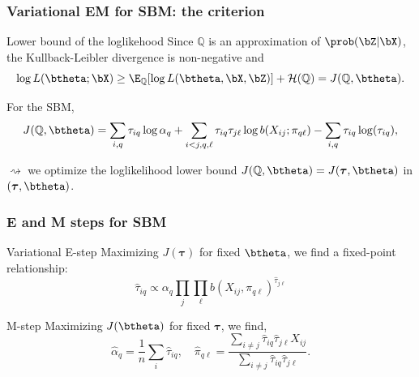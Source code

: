 \documentclass{beamer}\usepackage[]{graphicx}\usepackage[]{color}
\begin{document}
\begin{frame}
  \frametitle{Variational EM for SBM: the criterion}

  \begin{block}{Lower bound of the loglikehood}
  Since $\mathbb{Q}$ is an approximation of $\prob(\bZ|\bX)$, the Kullback-Leibler divergence is non-negative and
    \begin{equation*}
      \log L(\btheta; \bX) \geq \E_{\mathbb{Q}} [\log L(\btheta, \bX,\bZ)] + \mathcal{H}(\mathbb{Q}) = J(\mathbb{Q},\btheta).
    \end{equation*}
  \end{block}

  For the SBM,
  \begin{equation*}
  J(\mathbb{Q},\btheta) = \sum_{i,q} \tau_{iq} \log \alpha_q + \sum_{i<j,q,\ell}  \tau_{iq}  \tau_{j\ell} \log b(X_{ij} ; \pi_{q\ell}) - \sum_{i,q} \tau_{iq} \log(\tau_{iq}),
  \end{equation*}

  $\rightsquigarrow$ we optimize the loglikelihood lower bound $J(\mathbb{Q},\btheta) = J(\boldsymbol\tau,\btheta)$ in $(\boldsymbol\tau, \btheta)$.

\end{frame}

\begin{frame}
  \frametitle{E and M steps for SBM}

  \begin{block}{Variational E-step}
    Maximizing $J(\boldsymbol\tau)$ for fixed $\btheta$, we find a fixed-point relationship:
    \begin{equation}
      \hat{\tau}_{iq} \varpropto \alpha_q \prod_{j} \prod_{\ell} b(X_{ij}, \pi_{q\ell})^{\hat{\tau}_{j\ell}}
    \end{equation}
  \end{block}

  \vfill

  \begin{block}{M-step}
    Maximizing $J(\btheta)$ for fixed $\boldsymbol\tau$, we find,
    \begin{equation}
\hat{\alpha}_q = \frac{1}{n}\sum_i \hat{\tau}_{iq} , \quad \hat\pi_{q\ell} = \frac{\sum_{i\neq j} \hat{\tau}_{iq}\hat{\tau}_{j\ell} X_{ij}}{\sum_{i\neq j} \hat{\tau}_{iq}\hat{\tau}_{j\ell}}.
\end{equation}
  \end{block}

\end{frame}
\end{document}
